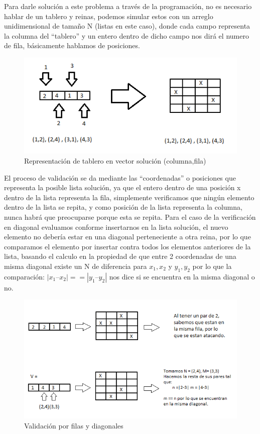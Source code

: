 \documentclass[12pt,a4paper]{article}
\begin{document}
\begin{enumerate}
Para darle solución a este problema a través de la programación, no es necesario hablar de un tablero y reinas, podemos simular estos con un arreglo unidimensional de tamaño N (listas en este caso), donde cada campo representa la columna del “tablero” y un entero dentro de dicho campo nos dirá el numero de fila, básicamente hablamos de posiciones.

\begin{figure}[htp]
\centering
\graphicspath{ {imagenes/} }
\includegraphics[scale=0.50]{Vectores.png}
\caption{Representación de tablero en vector solución (columna,fila)}
\label{foto}
\end{figure}

El proceso de validación se da mediante las “coordenadas” o posiciones que representa la posible lista solución, ya que el entero dentro de una posición x dentro de la lista representa la fila, simplemente verificamos que ningún elemento dentro de la lista se repita, y como posición de la lista representa la columna, nunca habrá que preocuparse porque esta se repita. Para el caso de la verificación en diagonal evaluamos conforme insertarnos en la lista solución, el nuevo elemento no debería estar en una diagonal perteneciente a otra reina, por lo que comparamos el elemento por insertar contra todos los elementos anteriores de la lista, basando el calculo en la propiedad de que entre 2 coordenadas de una misma diagonal existe un N de diferencia para $x_1,x_2$ y $y_1,y_2$ por lo que la comparación: $|x_1 – x_2| == |y_1 – y_2|$  nos dice si se encuentra en la misma diagonal o no.

\begin{figure}[htp]
\centering
\graphicspath{ {imagenes/} }
\includegraphics[scale=0.50]{validaciones.png}
\caption{Validación por filas y diagonales}
\label{foto}
\end{figure}


\end{enumerate}
\end{document}
